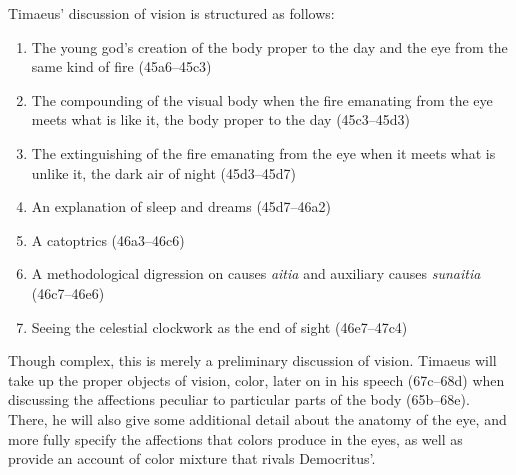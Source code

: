 Timaeus' discussion of vision is structured as follows:
\begin{enumerate}
	\item The young god's creation of the body proper to the day and the eye from the same kind of fire (45a6--45c3)
	\item The compounding of the visual body when the fire emanating from the eye meets what is like it, the body proper to the day (45c3--45d3)
	\item The extinguishing of the fire emanating from the eye when it meets what is unlike it, the dark air of night (45d3--45d7)
	\item An explanation of sleep and dreams (45d7--46a2)
	\item A catoptrics (46a3--46c6)
	\item A methodological digression on causes \emph{aitia} and auxiliary causes \emph{sunaitia} (46c7--46e6)
	\item Seeing the celestial clockwork as the end of sight (46e7--47c4)
\end{enumerate}
Though complex, this is merely a preliminary discussion of vision. Timaeus will take up the proper objects of vision, color, later on in his speech (67c–68d) when discussing the affections peculiar to particular parts of the body (65b–68e). There, he will also give some additional detail about the anatomy of the eye, and more fully specify the affections that colors produce in the eyes, as well as provide an account of color mixture that rivals Democritus'.

